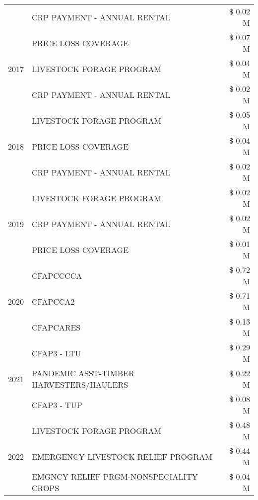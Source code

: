 \begin{tabular}{llr}
 & CRP PAYMENT - ANNUAL RENTAL & \$ 0.02 M \\
\cline{1-3}
\multirow[t]{3}{*}{2017} & PRICE LOSS COVERAGE & \$ 0.07 M \\
 & LIVESTOCK FORAGE PROGRAM & \$ 0.04 M \\
 & CRP PAYMENT - ANNUAL RENTAL & \$ 0.02 M \\
\cline{1-3}
\multirow[t]{3}{*}{2018} & LIVESTOCK FORAGE PROGRAM & \$ 0.05 M \\
 & PRICE LOSS COVERAGE & \$ 0.04 M \\
 & CRP PAYMENT - ANNUAL RENTAL & \$ 0.02 M \\
\cline{1-3}
\multirow[t]{3}{*}{2019} & LIVESTOCK FORAGE PROGRAM & \$ 0.02 M \\
 & CRP PAYMENT - ANNUAL RENTAL & \$ 0.02 M \\
 & PRICE LOSS COVERAGE & \$ 0.01 M \\
\cline{1-3}
\multirow[t]{3}{*}{2020} & CFAPCCCCA & \$ 0.72 M \\
 & CFAPCCA2 & \$ 0.71 M \\
 & CFAPCARES & \$ 0.13 M \\
\cline{1-3}
\multirow[t]{3}{*}{2021} & CFAP3 - LTU & \$ 0.29 M \\
 & PANDEMIC ASST-TIMBER HARVESTERS/HAULERS & \$ 0.22 M \\
 & CFAP3 - TUP & \$ 0.08 M \\
\cline{1-3}
\multirow[t]{3}{*}{2022} & LIVESTOCK FORAGE PROGRAM & \$ 0.48 M \\
 & EMERGENCY LIVESTOCK RELIEF PROGRAM & \$ 0.44 M \\
 & EMGNCY RELIEF PRGM-NONSPECIALITY CROPS & \$ 0.04 M \\
\cline{1-3}
\bottomrule
\end{tabular}
